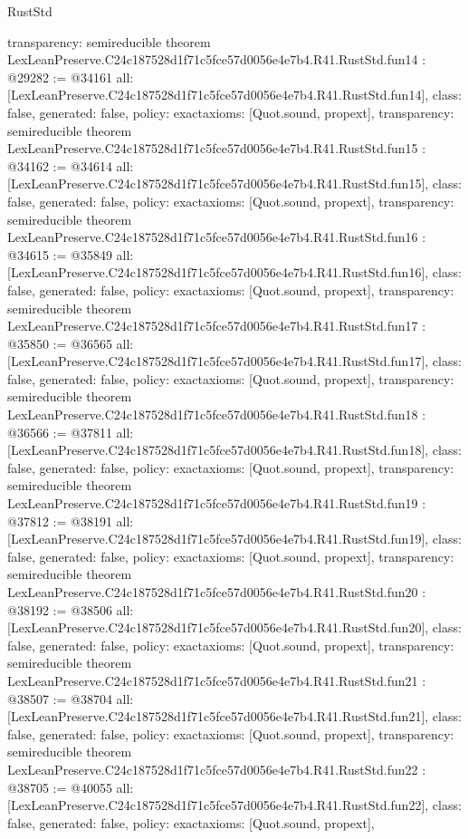 \begin{lexlean}{RustStd}
\begin{coremodule}
{  transparency: semireducible
}
theorem LexLeanPreserve.C24c187528d1f71c5fce57d0056e4e7b4.R41.RustStd.fun14 : @29282 := @34161 {
  all: [LexLeanPreserve.C24c187528d1f71c5fce57d0056e4e7b4.R41.RustStd.fun14],
  class: false,
  generated: false,
  policy: exact{axioms: [Quot.sound, propext]},
  transparency: semireducible
}
theorem LexLeanPreserve.C24c187528d1f71c5fce57d0056e4e7b4.R41.RustStd.fun15 : @34162 := @34614 {
  all: [LexLeanPreserve.C24c187528d1f71c5fce57d0056e4e7b4.R41.RustStd.fun15],
  class: false,
  generated: false,
  policy: exact{axioms: [Quot.sound, propext]},
  transparency: semireducible
}
theorem LexLeanPreserve.C24c187528d1f71c5fce57d0056e4e7b4.R41.RustStd.fun16 : @34615 := @35849 {
  all: [LexLeanPreserve.C24c187528d1f71c5fce57d0056e4e7b4.R41.RustStd.fun16],
  class: false,
  generated: false,
  policy: exact{axioms: [Quot.sound, propext]},
  transparency: semireducible
}
theorem LexLeanPreserve.C24c187528d1f71c5fce57d0056e4e7b4.R41.RustStd.fun17 : @35850 := @36565 {
  all: [LexLeanPreserve.C24c187528d1f71c5fce57d0056e4e7b4.R41.RustStd.fun17],
  class: false,
  generated: false,
  policy: exact{axioms: [Quot.sound, propext]},
  transparency: semireducible
}
theorem LexLeanPreserve.C24c187528d1f71c5fce57d0056e4e7b4.R41.RustStd.fun18 : @36566 := @37811 {
  all: [LexLeanPreserve.C24c187528d1f71c5fce57d0056e4e7b4.R41.RustStd.fun18],
  class: false,
  generated: false,
  policy: exact{axioms: [Quot.sound, propext]},
  transparency: semireducible
}
theorem LexLeanPreserve.C24c187528d1f71c5fce57d0056e4e7b4.R41.RustStd.fun19 : @37812 := @38191 {
  all: [LexLeanPreserve.C24c187528d1f71c5fce57d0056e4e7b4.R41.RustStd.fun19],
  class: false,
  generated: false,
  policy: exact{axioms: [Quot.sound, propext]},
  transparency: semireducible
}
theorem LexLeanPreserve.C24c187528d1f71c5fce57d0056e4e7b4.R41.RustStd.fun20 : @38192 := @38506 {
  all: [LexLeanPreserve.C24c187528d1f71c5fce57d0056e4e7b4.R41.RustStd.fun20],
  class: false,
  generated: false,
  policy: exact{axioms: [Quot.sound, propext]},
  transparency: semireducible
}
theorem LexLeanPreserve.C24c187528d1f71c5fce57d0056e4e7b4.R41.RustStd.fun21 : @38507 := @38704 {
  all: [LexLeanPreserve.C24c187528d1f71c5fce57d0056e4e7b4.R41.RustStd.fun21],
  class: false,
  generated: false,
  policy: exact{axioms: [Quot.sound, propext]},
  transparency: semireducible
}
theorem LexLeanPreserve.C24c187528d1f71c5fce57d0056e4e7b4.R41.RustStd.fun22 : @38705 := @40055 {
  all: [LexLeanPreserve.C24c187528d1f71c5fce57d0056e4e7b4.R41.RustStd.fun22],
  class: false,
  generated: false,
  policy: exact{axioms: [Quot.sound, propext]},
}
\end{coremodule}
\end{lexlean}
